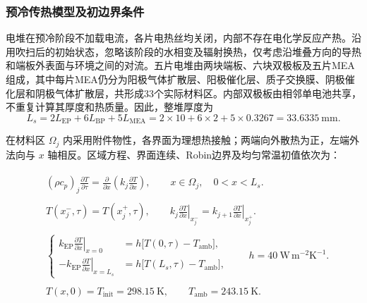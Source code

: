 \documentclass[bwprint]{gmcmthesis}
\numberwithin{equation}{section}
\numberwithin{figure}{section}
\begin{document}
\subsubsection{预冷传热模型及初边界条件}

电堆在预冷阶段不加载电流，各片电热丝均关闭，内部不存在电化学反应产热。沿用吹扫后的初始状态，忽略该阶段的水相变及辐射换热，仅考虑沿堆叠方向的导热和端板外表面与环境之间的对流。五片电堆由两块端板、六块双极板及五片MEA组成，其中每片MEA仍分为阳极气体扩散层、阳极催化层、质子交换膜、阴极催化层和阴极气体扩散层，共形成33个实际材料区。内部双极板由相邻单电池共享，不重复计算其厚度和热质量。因此，整堆厚度为
\begin{equation}
L_s=2L_{\mathrm{EP}}+6L_{\mathrm{BP}}+5L_{\mathrm{MEA}}
=2\times10+6\times2+5\times0.3267=33.6335\ \mathrm{mm}.
\label{eq:q4:stack_length}
\end{equation}

在材料区 $\Omega_j$ 内采用附件物性，各界面为理想热接触；两端向外散热为正，左端外法向与 $x$ 轴相反。区域方程、界面连续、Robin边界及均匀常温初值依次为：

\begin{align}
&
\begin{gathered}
(\rho c_p)_j\frac{\partial T}{\partial\tau}
=\frac{\partial}{\partial x}\left(k_j\frac{\partial T}{\partial x}\right),
\qquad x\in\Omega_j,\quad 0<x<L_s.
\end{gathered}
\label{eq:q4:precool_pde}\\
&
\begin{gathered}
T(x_j^-,\tau)=T(x_j^+,\tau),\qquad
k_j\left.\frac{\partial T}{\partial x}\right|_{x_j^-}
=k_{j+1}\left.\frac{\partial T}{\partial x}\right|_{x_j^+}.
\end{gathered}
\label{eq:q4:precool_interface}\\
&
\begin{gathered}
\left\{\begin{aligned}
k_{\mathrm{EP}}\left.\frac{\partial T}{\partial x}\right|_{x=0}
&=h\big[T(0,\tau)-T_{\mathrm{amb}}\big],\\
-k_{\mathrm{EP}}\left.\frac{\partial T}{\partial x}\right|_{x=L_s}
&=h\big[T(L_s,\tau)-T_{\mathrm{amb}}\big],
\end{aligned}\right.
\qquad h=40\ \mathrm{W\,m^{-2}K^{-1}}.
\end{gathered}
\label{eq:q4:precool_robin}\\
&
\begin{gathered}
T(x,0)=T_{\mathrm{init}}=298.15\ \mathrm K,\qquad
T_{\mathrm{amb}}=243.15\ \mathrm K.
\end{gathered}
\label{eq:q4:precool_initial}
\end{align}
\end{document}
